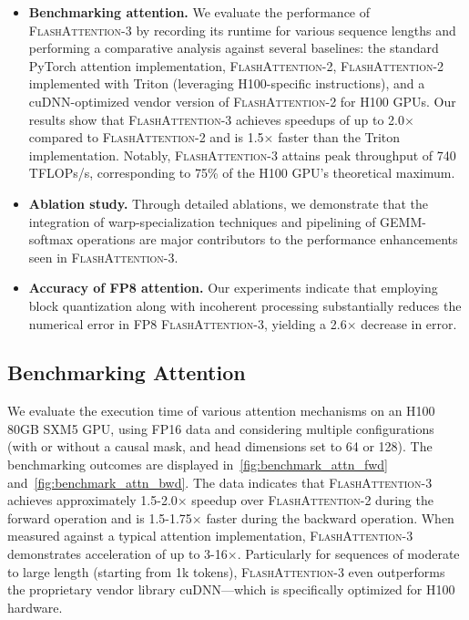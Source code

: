 \begin{itemize}

\item \textbf{Benchmarking attention.} We evaluate the performance of \textsc{FlashAttention-3} by recording its runtime for various sequence lengths and performing a comparative analysis against several baselines: the standard PyTorch attention implementation, \textsc{FlashAttention-2}, \textsc{FlashAttention-2} implemented with Triton (leveraging H100-specific instructions), and a cuDNN-optimized vendor version of \textsc{FlashAttention-2} for H100 GPUs. Our results show that \textsc{FlashAttention-3} achieves speedups of up to 2.0$\times$ compared to \textsc{FlashAttention-2} and is 1.5$\times$ faster than the Triton implementation. Notably, \textsc{FlashAttention-3} attains peak throughput of 740 TFLOPs/s, corresponding to 75\% of the H100 GPU's theoretical maximum.

\item \textbf{Ablation study.} Through detailed ablations, we demonstrate that the integration of warp-specialization techniques and pipelining of GEMM-softmax operations are major contributors to the performance enhancements seen in \textsc{FlashAttention-3}.

\item \textbf{Accuracy of FP8 attention.} Our experiments indicate that employing block quantization along with incoherent processing substantially reduces the numerical error in FP8 \textsc{FlashAttention-3}, yielding a 2.6$\times$ decrease in error.
\end{itemize}

\subsection{Benchmarking Attention}
\label{subsec:benchmark_attn}

We evaluate the execution time of various attention mechanisms on an H100 80GB SXM5 GPU, using FP16 data and considering multiple configurations (with or without a causal mask, and head dimensions set to 64 or 128). The benchmarking outcomes are displayed in~\cref{fig:benchmark_attn_fwd} and~\cref{fig:benchmark_attn_bwd}. The data indicates that \textsc{FlashAttention-3} achieves approximately 1.5-2.0$\times$ speedup over \textsc{FlashAttention-2} during the forward operation and is 1.5-1.75$\times$ faster during the backward operation. When measured against a typical attention implementation, \textsc{FlashAttention-3} demonstrates acceleration of up to 3-16$\times$. Particularly for sequences of moderate to large length (starting from 1k tokens), \textsc{FlashAttention-3} even outperforms the proprietary vendor library cuDNN—which is specifically optimized for H100 hardware.

